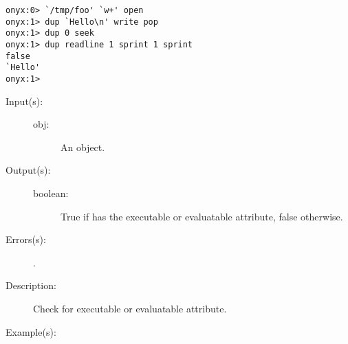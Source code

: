 \begin{description}
\begin{description}
\begin{verbatim}
onyx:0> `/tmp/foo' `w+' open
onyx:1> dup `Hello\n' write pop
onyx:1> dup 0 seek
onyx:1> dup readline 1 sprint 1 sprint
false
`Hello'
onyx:1>
		\end{verbatim}
	\end{description}
\label{systemdict:xcheck}
\item[{\onyxop{obj}{xcheck}{boolean}}: ]
	\begin{description}\item[]
	\item[Input(s): ]
		\begin{description}\item[]
		\item[obj: ]
			An object.
		\end{description}
	\item[Output(s): ]
		\begin{description}\item[]
		\item[boolean: ]
			True if  has the executable or evaluatable
			attribute, false otherwise.
		\end{description}
	\item[Errors(s): ]
		\begin{description}\item[]
		\item[.]
		\end{description}
	\item[Description: ]
		Check  for executable or evaluatable attribute.
	\item[Example(s): ]\begin{verbatim}


\end{verbatim}
\end{description}
\end{description}
